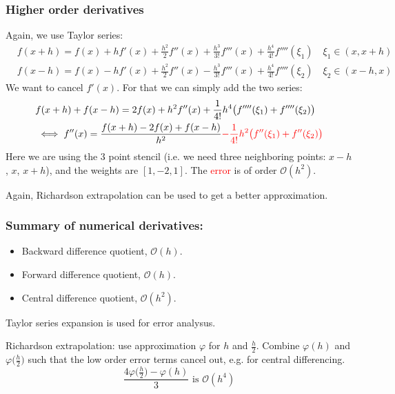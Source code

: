 \subsubsection{Higher order derivatives}
Again, we use Taylor series:
\begin{align*}
    &
    f(x+h) = f(x) + hf'(x) + \frac{h^2}{2} f''(x) + \frac{h^3}{3!} f'''(x) 
    + \frac{h^4}{4!} f''''(\xi_1) \quad \xi_1 \in (x, x + h)
    \\&
    f(x - h) = f(x) - hf'(x) + \frac{h^2}{2} f''(x) - \frac{h^3}{3!} f'''(x) 
    + \frac{h^4}{4!} f''''(\xi_2) \quad \xi_2 \in (x - h, x)
\end{align*}
We want to cancel $f'(x)$. For that we can simply add the two series:
\begin{align*}
    &f(x + h) + f(x - h) = 2f(x) + h^2 f''(x) + \frac{1}{4!} h^4 \bigl(
        f''''(\xi_1) + f''''(\xi_2)
    \bigr)
    \\&\iff
    f''(x) = \frac{f(x+h) - 2f(x) + f(x-h)}{h^2}
    \textcolor{red}{- \frac{1}{4!} h^2 \bigl(f''(\xi_1) + f''(\xi_2)\bigr) }
\end{align*}
Here we are using the 3 point stencil (i.e. we need three neighboring points:
$x - h$, $x$, $x+h$), and the weights are $[1, -2, 1]$.
The \textcolor{red}{error} is of order $\mathcal{O}(h^2)$.

Again, Richardson extrapolation can be used to get a better approximation.

\subsubsection*{Summary of numerical derivatives:}
\begin{itemize}
    \item {
        Backward difference quotient, $\mathcal{O}(h)$.
    }
    \item {
        Forward difference quotient, $\mathcal{O}(h)$.
    }
    \item {
        Central difference quotient, $\mathcal{O}(h^2)$.
    }
\end{itemize}
Taylor series expansion is used for error analysus.

Richardson extrapolation: use approximation $\varphi$ for $h$ and $\frac{h}{2}$.
Combine $\varphi(h)$ and $\varphi\bigl(\frac{h}{2}\bigr)$ such that
the low order error terms cancel out, e.g. for central differencing.
\[
    \frac{4 \varphi\bigl(\frac{h}{2}\bigr) - \varphi(h)}{3}
    \text{ is } \mathcal{O}(h^4)
\]

